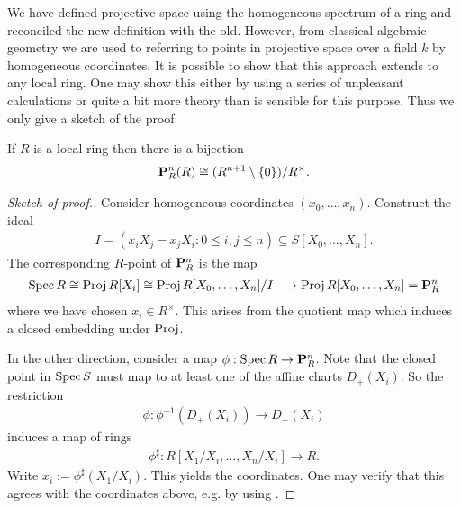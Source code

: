 \documentclass{article}
\begin{document}
We have defined projective space using the homogeneous spectrum
of a ring and reconciled the new definition with the old. However,
from classical algebraic geometry we are used to referring to points
in projective space over a field $k$ by homogeneous coordinates.
It is possible to show that this approach extends to any local ring.
One may show this either by using a series of unpleasant calculations
or quite a bit more theory than is sensible for this purpose.
Thus we only give a sketch of the proof:

\begin{lemma}
  If $R$ is a local ring then there is a bijection
  \begin{align*}
    \mathbf{P}^{n}_{R}(R) \cong
    (R^{n+1}\setminus\left\lbrace{0}\right\rbrace)/R^\times.
  \end{align*}
  \begin{proof}[Sketch of proof.]
    Consider homogeneous coordinates $(x_0,\ldots,x_n)$.
    Construct the ideal
    \begin{align}\label{eq:homogeneous_ideal}
      I = (x_i X_j - x_j X_i : 0 \leq i,j\leq n) \subseteq S[X_0,\ldots,X_n].
    \end{align}
    The corresponding $R$-point of $\mathbf{P}^{n}_{R}$ is the map
    \begin{align*}
      \operatorname{Spec} R \cong
      \operatorname{Proj} R[X_i] \cong
      \operatorname{Proj} R[X_0,\ldots,X_n]/I
      \longrightarrow \operatorname{Proj} R[X_0,\ldots,X_n]
      = \mathbf{P}^{n}_{R}
    \end{align*}
    where we have chosen $x_i\in R^\times$.
    This arises from the quotient map which induces a closed
    embedding under $\operatorname{Proj}$. \cite{ellingsrud2023}


    In the other direction, consider a map
    $\phi:\operatorname{Spec} R \to \mathbf{P}^{n}_{R}$.
    Note that the closed point in $\operatorname{Spec} S$ must map to at least
    one of the affine charts $D_+(X_i)$. So the
    restriction
    \begin{align*}
      \phi : {\phi}^{-1}(D_+(X_i)) \to D_+(X_i)
    \end{align*}
    induces a map of rings
    \begin{align*}
      \phi^\sharp : R[X_1/X_i,\ldots,X_n/X_i] \to R.
    \end{align*}
    Write $x_i := \phi^\sharp(X_1/X_i)$. This yields the
    coordinates. One may verify that this agrees with the
    coordinates above, e.g. by using \cite[{Proposition 13.24}]{gortz2010}.
  \end{proof}
\end{lemma}
\end{document}
